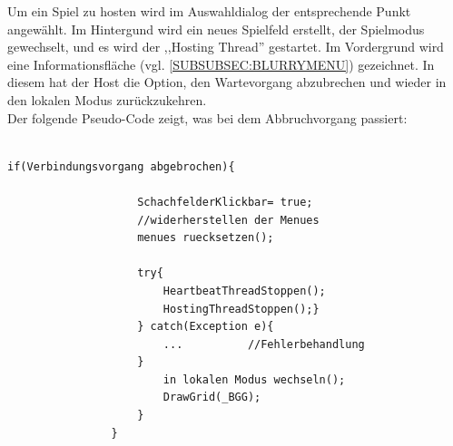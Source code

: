 \documentclass[12pt,a4paper]{article}
\begin{document}
Um ein Spiel zu hosten wird im Auswahldialog der entsprechende Punkt angewählt. 
Im Hintergund wird ein neues Spielfeld erstellt, der Spielmodus gewechselt, und es wird der ,,Hosting Thread'' gestartet.
Im Vordergrund wird eine Informationsfläche (vgl. \ref{SUBSUBSEC:BLURRYMENU}) gezeichnet. In diesem hat der Host die Option, den Wartevorgang abzubrechen und wieder in den lokalen Modus zurückzukehren. \\
Der folgende Pseudo-Code zeigt, was bei dem Abbruchvorgang passiert: 
\lstset{language=java}
\begin{lstlisting}

if(Verbindungsvorgang abgebrochen){

					SchachfelderKlickbar= true; 
					//widerherstellen der Menues
					menues ruecksetzen();		
						
					try{	
						HeartbeatThreadStoppen();
						HostingThreadStoppen();}
					} catch(Exception e){
						...			 //Fehlerbehandlung
					}
						in lokalen Modus wechseln();
						DrawGrid(_BGG);
					}
				}

\end{lstlisting}
\end{document}
